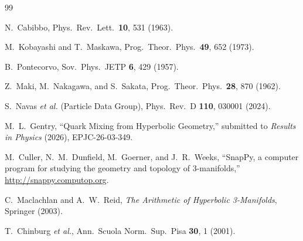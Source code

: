 \documentclass[floatfix,aps,prd,twocolumn,showpacs,superscriptaddress,longbibliography]{revtex4-2}
\begin{document}
\begin{thebibliography}{99}

N.~Cabibbo, Phys.\ Rev.\ Lett.\ \textbf{10}, 531 (1963).

M.~Kobayashi and T.~Maskawa, Prog.\ Theor.\ Phys.\ \textbf{49}, 652 (1973).

B.~Pontecorvo, Sov.\ Phys.\ JETP \textbf{6}, 429 (1957).

Z.~Maki, M.~Nakagawa, and S.~Sakata,
Prog.\ Theor.\ Phys.\ \textbf{28}, 870 (1962).

S.~Navas \textit{et al.} (Particle Data Group),
Phys.\ Rev.\ D \textbf{110}, 030001 (2024).

M.~L.~Gentry,
``Quark Mixing from Hyperbolic Geometry,''
submitted to \textit{Results in Physics} (2026), EPJC-26-03-349.

M.~Culler, N.~M.~Dunfield, M.~Goerner, and J.~R.~Weeks,
``SnapPy, a computer program for studying the geometry and topology
of 3-manifolds,'' \url{http://snappy.computop.org}.

C.~Maclachlan and A.~W.~Reid,
\emph{The Arithmetic of Hyperbolic 3-Manifolds},
Springer (2003).

T.~Chinburg \textit{et al.},
Ann.\ Scuola Norm.\ Sup.\ Pisa \textbf{30}, 1 (2001).

\end{thebibliography}
\end{document}
